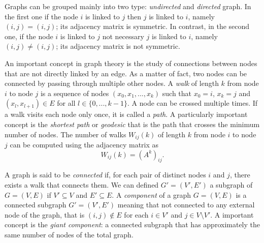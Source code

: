 Graphs can be grouped mainly into two type: \textit{undirected} and \textit{directed} graph. In the first one if the node $i$ is linked to $j$ then $j$ is linked to $i$, namely $(i, j) = (i, j)$; its adjacency matrix is symmetric.
In contrast, in the second one, if the node $i$ is linked to $j$ not necessary $j$ is linked to $i$, namely $(i, j) \neq (i, j)$; its adjacency matrix is not symmetric.

An important concept in graph theory is the study of connections between nodes that are not directly linked by an edge. As a matter of fact, two nodes can be connected by passing through multiple other nodes.
A \textit{walk} of length $k$ from node $i$ to node $j$ is a sequence of nodes $(x_0,x_1,...,x_k)$ such that $x_0=i$, $x_k=j$ and $(x_l, x_{l+1}) \in E$ for all $l \in \{0, ..., k-1\}$. A node can be crossed multiple times.  
If a walk visits each node only once, it is called a \textit{path}.
A particularly important concept is the \textit{shortest path} or \textit{geodesic} that is the path that crosses the minimum number of nodes.  
The number of walks $W_{ij}(k)$ of length $k$ from node $i$ to node $j$ can be computed using the adjacency matrix as
\begin{equation}
    W_{ij}(k) = (A^k)_{ij} .
\end{equation}

A graph is said to be \textit{connected} if, for each pair of distinct nodes $i$ and $j$, there exists a walk that connects them. 
We can defined $G' =(V',E')$ a subgraph of $G= (V,E)$ if $V' \subseteq V$ and $E' \subseteq E$.
A \textit{component} of a graph $G= (V,E)$ is a connected subgraph $G' =(V',E')$ meaning that not connected to any external node of the graph, that is $(i,j)\notin E$ for each $i\in V'$ and $j\in V\setminus V'$. 
A important concept is the \textit{giant component}: a connected subgraph that has approximately the same number of nodes of the total graph. 





